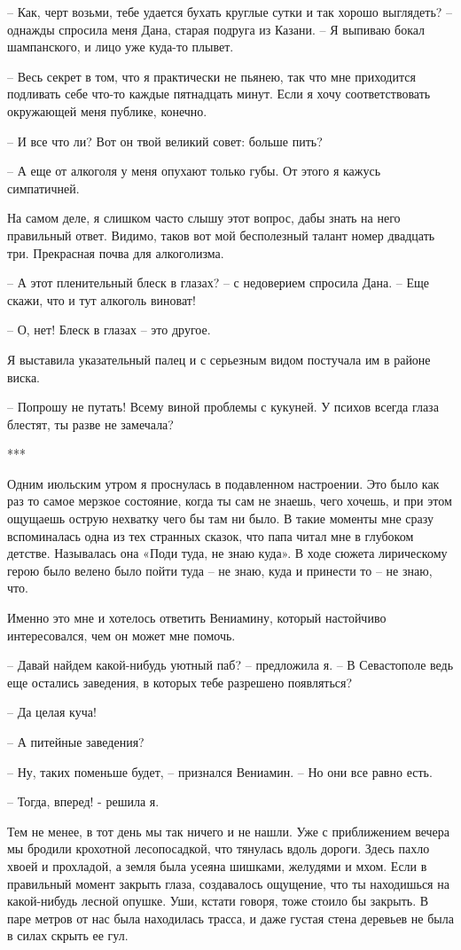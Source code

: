 \documentclass[
]{book}
\begin{document}
-- Как, черт возьми, тебе удается бухать круглые сутки и так хорошо выглядеть? -- однажды спросила меня Дана, старая подруга из Казани. -- Я выпиваю бокал шампанского, и лицо уже куда-то плывет.

-- Весь секрет в том, что я практически не пьянею, так что мне приходится подливать себе что-то каждые пятнадцать минут. Если я хочу соответствовать окружающей меня публике, конечно.

-- И все что ли? Вот он твой великий совет: больше пить?

-- А еще от алкоголя у меня опухают только губы. От этого я кажусь симпатичней.

На самом деле, я слишком часто слышу этот вопрос, дабы знать на него правильный ответ. Видимо, таков вот мой бесполезный талант номер двадцать три. Прекрасная почва для алкоголизма.

-- А этот пленительный блеск в глазах? -- с недоверием спросила Дана. -- Еще скажи, что и тут алкоголь виноват!

-- О, нет! Блеск в глазах -- это другое.

Я выставила указательный палец и с серьезным видом постучала им в районе виска.

-- Попрошу не путать! Всему виной проблемы с кукуней. У психов всегда глаза блестят, ты разве не замечала?

***

Одним июльским утром я проснулась в подавленном настроении. Это было как раз то самое мерзкое состояние, когда ты сам не знаешь, чего хочешь, и при этом ощущаешь острую нехватку чего бы там ни было. В такие моменты мне сразу вспоминалась одна из тех странных сказок, что папа читал мне в глубоком детстве. Называлась она «Поди туда, не знаю куда». В ходе сюжета лирическому герою было велено было пойти туда -- не знаю, куда и принести то -- не знаю, что.

Именно это мне и хотелось ответить Вениамину, который настойчиво интересовался, чем он может мне помочь.

-- Давай найдем какой-нибудь уютный паб? -- предложила я. -- В Севастополе ведь еще остались заведения, в которых тебе разрешено появляться?

-- Да целая куча!

-- А питейные заведения?

-- Ну, таких поменьше будет, -- признался Вениамин. -- Но они все равно есть.

-- Тогда, вперед! - решила я.

Тем не менее, в тот день мы так ничего и не нашли. Уже с приближением вечера мы бродили крохотной лесопосадкой, что тянулась вдоль дороги. Здесь пахло хвоей и прохладой, а земля была усеяна шишками, желудями и мхом. Если в правильный момент закрыть глаза, создавалось ощущение, что ты находишься на какой-нибудь лесной опушке. Уши, кстати говоря, тоже стоило бы закрыть. В паре метров от нас была находилась трасса, и даже густая стена деревьев не была в силах скрыть ее гул.
\end{document}
